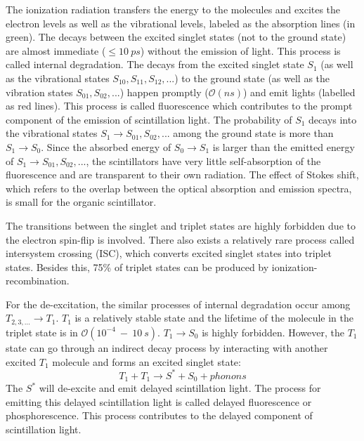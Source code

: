 The ionization radiation transfers the energy to the molecules and excites the electron levels as well as the vibrational levels, labeled as the absorption lines (in green). The decays between the excited singlet states (not to the ground state) are almost immediate ($\leq 10~ps$) without the emission of light. This process is called internal degradation. The decays from the excited singlet state $S_1$ (as well as the vibrational states $S_{10},S_{11},S_{12},...$) to the ground state (as well as the vibration states $S_{01}, S_{02}, ...$) happen promptly ($\mathcal{O}(ns)$) and emit lights (labelled as red lines). This process is called fluorescence which contributes to the prompt component of the emission of scintillation light. The probability of $S_1$ decays into the vibrational states $S_1 \to S_{01},S_{02},...$ among the ground state is more than $S_1\to S_0$. Since the absorbed energy of $S_0 \to S_1$ is larger than the emitted energy of $S_1 \to S_{01}, S_{02},...$, the scintillators have very little self-absorption of the fluorescence and are transparent to their own radiation. The effect of Stokes shift, which refers to the overlap between the optical absorption and emission spectra, is small for the organic scintillator\cite{leo2012techniques,knoll2010radiation}. 

The transitions between the singlet and triplet states are highly forbidden due to the
electron spin-flip is involved\cite{von2015measurement,sorensen2016temperature}. There also exists a relatively rare process called intersystem crossing (ISC), which converts excited singlet states into triplet states. Besides this, 75\% of triplet states can be produced by ionization-recombination\cite{von2015measurement,dunger2018topological}.

For the de-excitation, the similar processes of internal degradation occur among $T_{2,3, ...} \to T_1$. $T_1$ is a relatively stable state and the lifetime of the molecule in the triplet state is in $\mathcal{O}(10^{-4}~-~10~s)$\cite{mcquarrie1997physical}. $T_1\to S_0$ is highly forbidden. However, the $T_1$ state can go through an indirect decay process by interacting with another excited $T_1$ molecule and forms an excited singlet state:
\[
T_1+T_1\to S^*+S_0+phonons
\]
The $S^*$ will de-excite and emit delayed scintillation light. The process for emitting this delayed scintillation light is called delayed fluorescence or phosphorescence\cite{leo2012techniques}. This process contributes to the delayed component of scintillation light.

